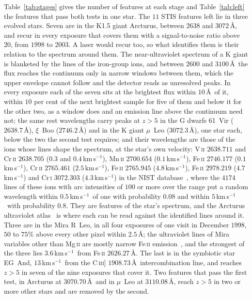 \documentclass[3p,11pt]{elsarticle}
\newcommand{\kms}{km\,s$^{-1}$}
\newcommand{\ion}[2]{#1\,\textsc{#2}}
\begin{document}
Table~\ref{tab:stages} gives the number of features at each stage and
Table~\ref{tab:left} the features that pass both tests in one star. The $11$ STIS
features left lie in three evolved stars. Seven are in the K1.5
giant Arcturus, between $2638$ and $3072$\,\AA, and recur in every exposure that covers
them with a signal-to-noise ratio above $20$, from $1998$ to $2003$. A laser would
recur too, so what identifies them is their relation to the spectrum around them. The
near-ultraviolet spectrum of a K giant is blanketed by the lines of the iron-group
ions, and between $2600$ and $3100$\,\AA\ the flux reaches the continuum only in
narrow windows between them, which the upper envelope cannot follow and the detector
reads as unresolved peaks. In every exposure each of the seven sits at the brightest
flux within $10$\,\AA\ of it, within $10$ per cent of the next brightest sample for
five of them and below it for the other two, as a window does and an emission line
above the continuum need not; the same rest wavelengths carry peaks at $z>5$ in the G
dwarfs 61~Vir ($2638.7$\,\AA), $\xi$~Boo ($2746.2$\,\AA) and in the K giant $\mu$~Leo
($3072.3$\,\AA), one star each, below the two the second test requires; and their
wavelengths are those of the ions whose lines shape the spectrum, at the star's own
velocity: \ion{V}{ii} $2638.711$ and \ion{Cr}{ii} $2638.705$ ($0.3$ and $0.4$\,\kms),
\ion{Mn}{ii} $2700.654$ ($0.1$\,\kms), \ion{Fe}{ii} $2746.177$ ($0.1$\,\kms),
\ion{Cr}{ii} $2765.461$ ($2.5$\,\kms), \ion{Fe}{ii} $2765.945$ ($4.8$\,\kms),
\ion{Fe}{ii} $2978.219$ ($4.7$\,\kms) and \ion{Cr}{i} $3072.303$ ($4.3$\,\kms) in the
NIST database~\cite{NIST}, where the $4174$ lines of these ions with arc intensities
of $100$ or more over the range put a random wavelength within $0.5$\,\kms\ of one with
probability $0.08$ and within $5$\,\kms\ with probability $0.8$. They are features of
the star's spectrum, and the Arcturus ultraviolet atlas~\cite{Hinkle2005} is where each
can be read against the identified lines around it. Three are in the Mira R~Leo, in all four exposures of one
visit in December $1998$, $50$ to $75\%$ above every other pixel within $2.5$\,\AA; the
ultraviolet lines of Mira variables other than \ion{Mg}{ii} are mostly narrow
\ion{Fe}{ii} emission~\cite{WoodKarovska2000}, and the strongest of the three lies
$3.6$\,\kms\ from \ion{Fe}{ii} $2626.27$\,\AA. The last is in the symbiotic star
EG~And, $13$\,\kms\ from the C\,\textsc{iii}] $1908.73$\,\AA\ intercombination line,
and reaches $z>5$ in seven of the nine exposures that cover it. Two features that pass
the first test, in Arcturus at $3070.70$\,\AA\ and in $\mu$~Leo at $3110.08$\,\AA, reach
$z>5$ in two or more other stars and are removed by the second.
\end{document}
